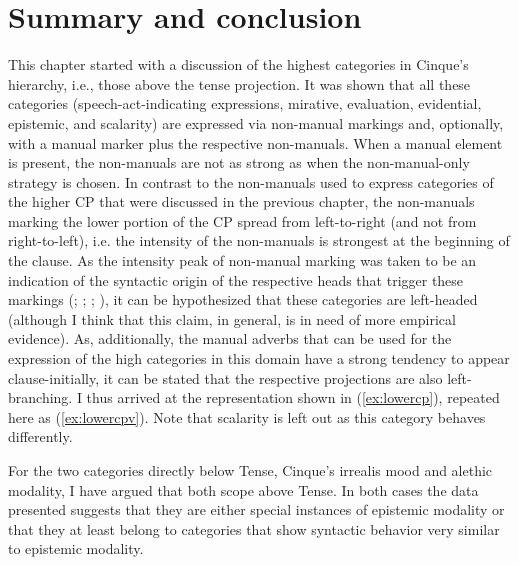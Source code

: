 \section{Summary and conclusion}
This chapter started with a discussion of the highest categories in Cinque's hierarchy, i.e., those above the tense projection. It was shown that all these categories (speech-act-indicating expressions, mirative, evaluation, evidential, epistemic, and scalarity) are expressed via non-manual markings and, optionally, with a manual marker plus the respective non-manuals. When a manual element is present, the non-manuals are not as strong as when the non-manual-only strategy is chosen. In contrast to the non-manuals used to express categories of the higher CP that were discussed in the previous chapter, the non-manuals marking the lower portion of the CP spread from left-to-right (and not from right-to-left), i.e. the intensity of the non-manuals is strongest at the beginning of the clause. As the intensity peak of non-manual marking was taken to be an indication of the syntactic origin of the respective heads that trigger these markings (\citealt{bahan1996}; \citealt{petronio1997}; \citealt[43--45]{neidle2000syntax}; \citealt[311--312]{sandler2006sign}), it can be hypothesized that these categories are left-headed (although I think that this claim, in general, is in need of more empirical evidence). As, additionally, the manual adverbs that can be used for the expression of the high categories in this domain have a strong tendency to appear clause-initially, it can be stated that the respective projections are also left-branching. I thus arrived at the representation shown in (\ref{ex:lowercp}), repeated here as (\ref{ex:lowercpv}). Note that scalarity is left out as this category behaves differently.


For the two categories directly below Tense, Cinque's irrealis mood and alethic modality, I have argued that both scope above Tense. In both cases the data presented suggests that they are either special instances of epistemic modality or that they at least belong to categories that show syntactic behavior very similar to epistemic modality.

